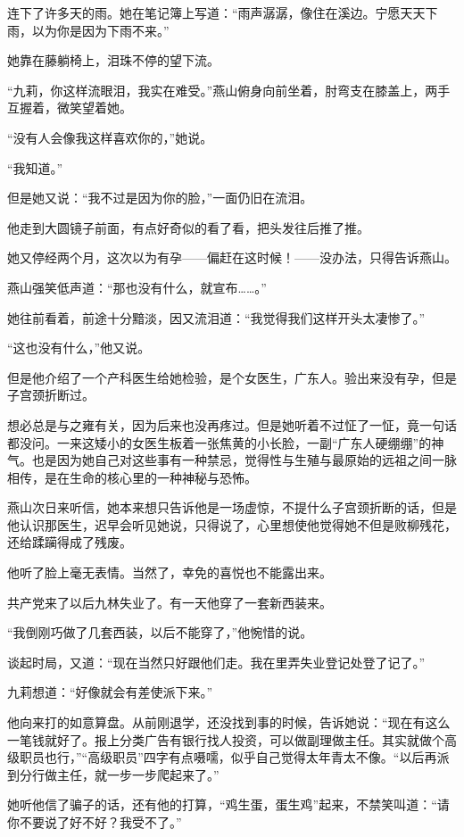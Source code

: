 \par 连下了许多天的雨。她在笔记簿上写道：“雨声潺潺，像住在溪边。宁愿天天下雨，以为你是因为下雨不来。”
\par 她靠在藤躺椅上，泪珠不停的望下流。
\par “九莉，你这样流眼泪，我实在难受。”燕山俯身向前坐着，肘弯支在膝盖上，两手互握着，微笑望着她。
\par “没有人会像我这样喜欢你的，”她说。
\par “我知道。”
\par 但是她又说：“我不过是因为你的脸，”一面仍旧在流泪。
\par 他走到大圆镜子前面，有点好奇似的看了看，把头发往后推了推。
\par 她又停经两个月，这次以为有孕——偏赶在这时候！——没办法，只得告诉燕山。
\par 燕山强笑低声道：“那也没有什么，就宣布……。”
\par 她往前看着，前途十分黯淡，因又流泪道：“我觉得我们这样开头太凄惨了。”
\par “这也没有什么，”他又说。
\par 但是他介绍了一个产科医生给她检验，是个女医生，广东人。验出来没有孕，但是子宫颈折断过。
\par 想必总是与之雍有关，因为后来也没再疼过。但是她听着不过怔了一怔，竟一句话都没问。一来这矮小的女医生板着一张焦黄的小长脸，一副“广东人硬绷绷”的神气。也是因为她自己对这些事有一种禁忌，觉得性与生殖与最原始的远祖之间一脉相传，是在生命的核心里的一种神秘与恐怖。
\par 燕山次日来听信，她本来想只告诉他是一场虚惊，不提什么子宫颈折断的话，但是他认识那医生，迟早会听见她说，只得说了，心里想使他觉得她不但是败柳残花，还给蹂躏得成了残废。
\par 他听了脸上毫无表情。当然了，幸免的喜悦也不能露出来。
\par 共产党来了以后九林失业了。有一天他穿了一套新西装来。
\par “我倒刚巧做了几套西装，以后不能穿了，”他惋惜的说。
\par 谈起时局，又道：“现在当然只好跟他们走。我在里弄失业登记处登了记了。”
\par 九莉想道：“好像就会有差使派下来。”
\par 他向来打的如意算盘。从前刚退学，还没找到事的时候，告诉她说：“现在有这么一笔钱就好了。报上分类广告有银行找人投资，可以做副理做主任。其实就做个高级职员也行，”“高级职员”四字有点嗫嚅，似乎自己觉得太年青太不像。“以后再派到分行做主任，就一步一步爬起来了。”
\par 她听他信了骗子的话，还有他的打算，“鸡生蛋，蛋生鸡”起来，不禁笑叫道：“请你不要说了好不好？我受不了。”
